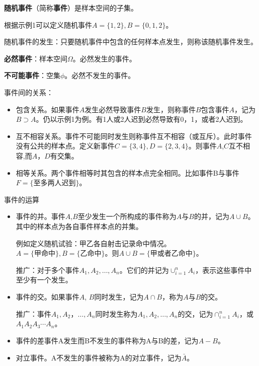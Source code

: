 \documentclass{beamer}
\begin{document}
	\begin{frame}
		\textbf{随机事件}（简称\textbf{事件}）是样本空间的子集。
		
		根据示例1可以定义随机事件$A=\{1, 2\}, B = \{0, 1, 2\}$。
		
		随机事件的发生：只要随机事件中包含的任何样本点发生，则称该随机事件发生。
		
		\textbf{必然事件}：样本空间$\Omega$。必然发生的事件。
		
		\textbf{不可能事件}：空集$\phi$。必然不发生的事件。
		
		事件间的关系：
		\begin{itemize}
			\item 包含关系。如果事件$A$发生必然导致事件$B$发生，则称事件$B$包含事件$A$，记为$B \supset A$。仍以示例1为例。有1人或2人迟到必然导致有0，1，或者2人迟到。
			\item 互不相容关系。事件不可能同时发生则称事件互不相容（或互斥）。此时事件没有公共的样本点。定义新事件$C = \{3, 4\}, D = \{2, 3, 4\}$。则事件$A$,$C$互不相容,而$A$，$D$有交集。
			\item 相等关系。两个事件相等时其包含的样本点完全相同。比如事件B与事件$F=\{\text{至多两人迟到}\}$。
		\end{itemize}
	\end{frame}
	\begin{frame}
		事件的运算
		\begin{itemize}
			\item 事件的并。事件$A$,$B$至少发生一个所构成的事件称为$A$与$B$的并，记为$A\cup B$。其中的样本点为各自事件样本点的并集。
			
			例如定义随机试验：甲乙各自射击记录命中情况。$A = \{\text{甲命中}\}, B = \{\text{乙命中}\}$。则$A\cup B = \{\text{甲或者乙命中}\}$。
			
			推广：对于多个事件$A_1, A_2, \dots, A_n$。它们的并记为$\cup_{i = 1}^{n}A_i$，表示这些事件中至少有一个发生。
			\item 事件的交。如果事件$A$, $B$同时发生，记为$A\cap B$，称为$A$与$B$的交。
			
			推广：事件$A_1, A_2， \dots, A_n$同时发生称为$A_1, A_2, \dots, A_n$的交，记为$\cap_{i = 1}^{n}A_i$，或$A_1 A_2 A_3 \cdots A_n$。
			\item 事件的差事件A发生而B不发生的事件称为A与B的差，记为$A-B$。
			\item 对立事件。A不发生的事件被称为A的对立事件，记为$\bar{A}$。
		\end{itemize}
	\end{frame}
	
\end{document}
